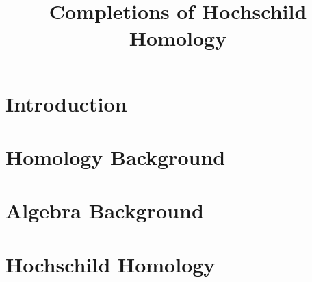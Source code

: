 \documentclass{report}
\date{}
\begin{document}
%        
%        
%        
%        
%        
%        
%        
%        
%        
%        

\title{ Completions of Hochschild Homology}
\maketitle

\tableofcontents
\newpage
\chapter{Introduction}


\chapter{Homology Background}


\chapter{Algebra Background}


\chapter{Hochschild Homology}

\end{document}
